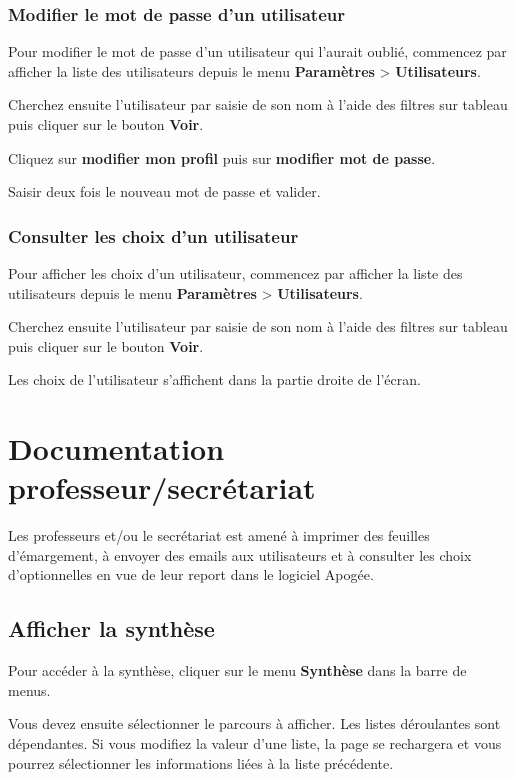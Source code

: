 \documentclass[letterpaper,10pt,french]{sphinxmanual}
\begin{document}
\subsection{Modifier le mot de passe d'un utilisateur}
\label{admin:modifier-le-mot-de-passe-d-un-utilisateur}
Pour modifier le mot de passe d'un utilisateur qui l'aurait oublié, commencez par afficher la liste des utilisateurs depuis le menu \textbf{Paramètres} \textgreater{} \textbf{Utilisateurs}.

Cherchez ensuite l'utilisateur par saisie de son nom à l'aide des filtres sur tableau puis cliquer sur le bouton \textbf{Voir}.

Cliquez sur \textbf{modifier mon profil} puis sur \textbf{modifier mot de passe}.

Saisir deux fois le nouveau mot de passe et valider.


\subsection{Consulter les choix d'un utilisateur}
\label{admin:consulter-les-choix-d-un-utilisateur}
Pour afficher les choix d'un utilisateur, commencez par afficher la liste des utilisateurs depuis le menu \textbf{Paramètres} \textgreater{} \textbf{Utilisateurs}.

Cherchez ensuite l'utilisateur par saisie de son nom à l'aide des filtres sur tableau puis cliquer sur le bouton \textbf{Voir}.

Les choix de l'utilisateur s'affichent dans la partie droite de l'écran.


\chapter{Documentation professeur/secrétariat}
\label{index:documentation-professeur-secretariat}
Les professeurs et/ou le secrétariat est amené à imprimer des feuilles d'émargement, à envoyer des emails aux utilisateurs et à consulter les choix d'optionnelles en vue de leur report dans le logiciel Apogée.


\section{Afficher la synthèse}
\label{prof:afficher-la-synthese}\label{prof::doc}
Pour accéder à la synthèse, cliquer sur le menu \textbf{Synthèse} dans la barre de menus.

Vous devez ensuite sélectionner le parcours à afficher. Les listes déroulantes sont dépendantes. Si vous modifiez la valeur d'une liste, la page se rechargera et vous pourrez sélectionner les informations liées à la liste précédente.
\end{document}
